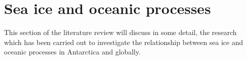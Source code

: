 \section{Sea ice and oceanic processes}
This section of the literature review will discuss in some detail, the research which has been carried out to investigate the relationship between sea ice and oceanic processes in Antarctica and globally.